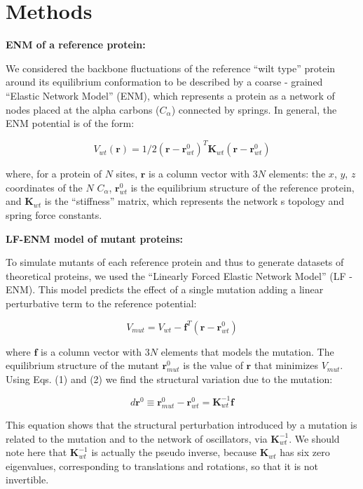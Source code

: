 \documentclass{article}
\begin{document}
\section{Methods}

{\bf ENM of a reference protein:} 

We considered the backbone fluctuations of the reference ``wilt type'' protein around its equilibrium conformation to be described by a coarse - grained ``Elastic Network Model'' (ENM), which represents a protein as a network of nodes placed at the alpha carbons ($C_{\alpha}$) connected by springs. In general, the ENM potential is of the form: 

\begin{equation}
V_{wt}(\mathbf{r}) = 1/2(\mathbf{r}-\mathbf{r}^{0}_{wt})^{T}\mathbf{K}_{wt}(\mathbf{r}-\mathbf{r}^{0}_{wt})
\end{equation}

where, for a protein of $N$ sites, $\mathbf{r}$ is a column vector with $3N$ elements: the $x$, $y$, $z$ coordinates of the $N$ $C_{\alpha}$, $\mathbf{r}^{0}_{wt}$ is the equilibrium structure of the reference protein, and $\mathbf{K}_{wt}$ is the ``stiffness'' matrix, which represents the network\textsc{} s topology and spring force constants.  

{\bf LF-ENM model of mutant proteins:}

To simulate mutants of each reference protein and thus to generate datasets of theoretical proteins, we used the ``Linearly Forced Elastic Network Model'' (LF - ENM). This model predicts the effect of a single mutation adding a linear perturbative term to the reference potential:

\begin{equation}
V_{mut}=V_{wt} - \mathbf{f}^{T}(\mathbf{r}-\mathbf{r}^{0}_{wt})
\end{equation}

where $\mathbf{f}$ is a column vector with $3N$ elements that models the mutation. The equilibrium structure of the mutant $\mathbf{r}^{0}_{mut}$ is the value of $\mathbf{r}$ that minimizes $V_{mut}$. Using Eqs. (1) and (2) we find the structural variation due to the mutation:

\begin{equation}
d\mathbf{r}^{0} \equiv  \mathbf{r}^{0}_{mut} - \mathbf{r}^{0}_{wt} = \mathbf{K}^{-1}_{wt}\mathbf{f}
\end{equation}

This equation shows that the structural perturbation introduced by a mutation is related to the mutation and to the network of oscillators, via $\mathbf{K}^{-1}_{wt}$. We should note here that $\mathbf{K}^{-1}_{wt}$ is actually the pseudo inverse, because $\mathbf{K}_{wt}$ has six zero eigenvalues, corresponding to translations and rotations, so that it is not invertible.
\end{document}
